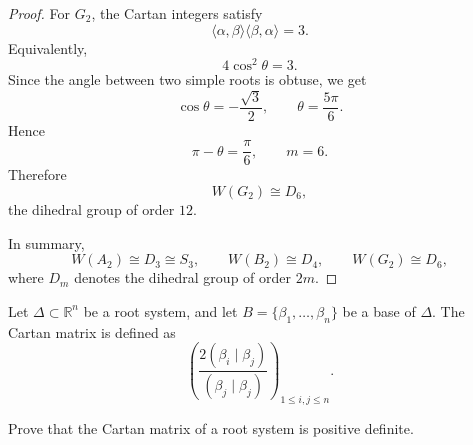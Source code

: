 \begin{proof}
    For \(G_2\), the Cartan integers satisfy
    \[
        \langle \alpha,\beta\rangle\langle \beta,\alpha\rangle=3.
    \]
    Equivalently,
    \[
        4\cos^2\theta=3.
    \]
    Since the angle between two simple roots is obtuse, we get
    \[
        \cos\theta=-\frac{\sqrt3}{2},
        \qquad
        \theta=\frac{5\pi}{6}.
    \]
    Hence
    \[
        \pi-\theta=\frac{\pi}{6},
        \qquad
        m=6.
    \]
    Therefore
    \[
        W(G_2)\cong D_6,
    \]
    the dihedral group of order \(12\).
    
    In summary,
    \[
        W(A_2)\cong D_3\cong S_3,\qquad
        W(B_2)\cong D_4,\qquad
        W(G_2)\cong D_6,
    \]
    where \(D_m\) denotes the dihedral group of order \(2m\).
    \end{proof}

Let \(\Delta\subset\mathbb{R}^n\) be a root system, and let \(B=\{\beta_1,\ldots,\beta_n\}\) be a base of \(\Delta\). The Cartan matrix is defined as
\[
    \left(
        \frac{2(\beta_i\mid\beta_j)}{(\beta_j\mid\beta_j)}
    \right)_{1\leq i,j\leq n}.
\]

\begin{exercise}
    Prove that the Cartan matrix of a root system is positive definite.
\end{exercise}

